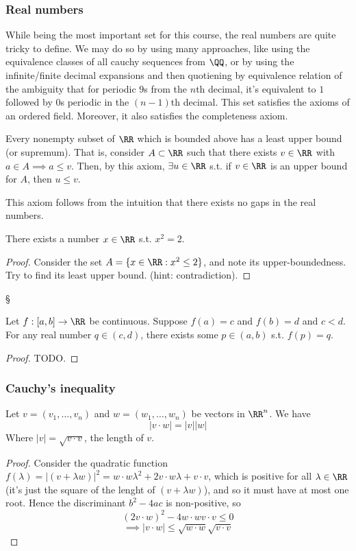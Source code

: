 \subsubsection{Real numbers}
While being the most important set for this course, the real numbers are quite
tricky to define. We may do so by using many approaches, like using the
equivalence classes of all cauchy sequences from $\QQ$, or by using the
infinite/finite decimal expansions and then quotiening by equivalence relation
of the ambiguity that for periodic $9$s from the $n$th decimal, it's equivalent
to $1$ followed by $0$s periodic in the $(n-1)$th decimal. This set satisfies
the axioms of an ordered field. Moreover, it also satisfies the completeness
axiom.
\begin{definition}
  Every nonempty subset of $\RR$ which is bounded above has a least upper
  bound (or supremum). That is, consider $A\subset\RR$ such that there exists
  $v\in\RR$ with $a\in A \implies a\leq v$. Then, by this axiom, $\exists
  u\in\RR$ s.t. if $v\in\RR$ is an upper bound for $A$, then $u\leq v$.
  \label{axiom:leastUpperBound}
\end{definition}
This axiom follows from the intuition that there exists no gaps in the real
numbers.
\begin{lemma}
  There exists a number $x\in\RR$ s.t. $x^2=2$.
  \label{lem:sqrt2}
\end{lemma}
\begin{proof}
  Consider the set $A=\{x\in\RR : x^2\leq 2\}$, and note its upper-boundedness.
  Try to find its least upper bound. (hint: contradiction).
\end{proof}§
\begin{theorem}
  Let $f:[a,b]\to\RR$ be continuous. Suppose $f(a)=c$ and $f(b)=d$ and $c<d$.
  For any real number $q\in(c,d)$, there exists some $p\in(a,b)$ s.t. $f(p)=q$.
  \label{thm:ivt}
\end{theorem}
\begin{proof}
  TODO.
\end{proof}
\subsubsection{Cauchy's inequality}
\begin{lemma}
  Let $v=(v_1,\dots,v_n)$ and $w=(w_1,\dots,w_n)$ be vectors in $\RR^n$. We have 
  \[|v\cdot w|=|v||w| \]
  Where $|v|=\sqrt{v\cdot v}$, the length of $v$.
  \label{lem:cauchyIneq}
\end{lemma}
\begin{proof}
  Consider the quadratic function $f(\lambda)=|(v+\lambda w)|^2=w\cdot w\lambda^2
  + 2v\cdot w \lambda + v\cdot v$, which is positive for all $\lambda\in\RR$
  (it's just the square of the lenght of $(v+\lambda w)$), and so it must have
  at most one root. Hence the discriminant $b^{2}-4ac$ is non-positive, so 
\[(2v\cdot w)^2 - 4 w\cdot w v\cdot v \leq 0\]
\[\implies |v\cdot w| \leq \sqrt{w\cdot w} \sqrt{v\cdot v}\]
\end{proof}
